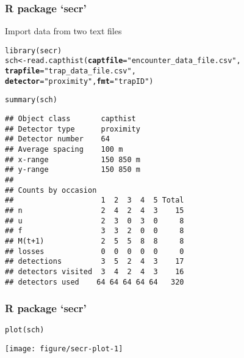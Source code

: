 \documentclass[color=usenames,dvipsnames]{beamer}\usepackage[]{graphicx}\usepackage[]{color}
\makeatletter
\newcommand{\hlstr}[1]{\textcolor[rgb]{0.749,0.012,0.012}{#1}}%
\newcommand{\hlstd}[1]{\textcolor[rgb]{0,0,0}{#1}}%
\newcommand{\hlkwb}[1]{\textcolor[rgb]{0,0.341,0.682}{#1}}%
\newcommand{\hlkwc}[1]{\textcolor[rgb]{0,0,0}{\textbf{#1}}}%
\newcommand{\hlkwd}[1]{\textcolor[rgb]{0.004,0.004,0.506}{#1}}%
\newenvironment{kframe}{%
 \def\at@end@of@kframe{}%
 \ifinner\ifhmode%
  \def\at@end@of@kframe{\end{minipage}}%
  \begin{minipage}{\columnwidth}%
 \fi\fi%
 \def\FrameCommand##1{\hskip\@totalleftmargin \hskip-\fboxsep
 \colorbox{shadecolor}{##1}\hskip-\fboxsep
     \hskip-\linewidth \hskip-\@totalleftmargin \hskip\columnwidth}%
 \MakeFramed {\advance\hsize-\width
   \@totalleftmargin\z@ \linewidth\hsize
   \@setminipage}}%
 {\par\unskip\endMakeFramed%
 \at@end@of@kframe}
\newenvironment{knitrout}{}{} %
\makeatother
\begin{document}
\begin{frame}[fragile]
  \frametitle{R package `secr'}
  Import data from two text files
\begin{knitrout}\tiny
{}\color{fgcolor}\begin{kframe}
\begin{alltt}
\hlkwd{library}\hlstd{(secr)}
\hlstd{sch} \hlkwb{<-} \hlkwd{read.capthist}\hlstd{(}\hlkwc{captfile}\hlstd{=}\hlstr{"encounter_data_file.csv"}\hlstd{,}
                     \hlkwc{trapfile}\hlstd{=}\hlstr{"trap_data_file.csv"}\hlstd{,}
                     \hlkwc{detector}\hlstd{=}\hlstr{"proximity"}\hlstd{,} \hlkwc{fmt}\hlstd{=}\hlstr{"trapID"}\hlstd{)}
\end{alltt}


{\ttfamily\noindent\itshape\color{messagecolor}{\#\# No errors found :-)}}\begin{alltt}
\hlkwd{summary}\hlstd{(sch)}
\end{alltt}
\begin{verbatim}
## Object class       capthist 
## Detector type      proximity 
## Detector number    64 
## Average spacing    100 m 
## x-range            150 850 m 
## y-range            150 850 m 
## 
## Counts by occasion 
##                    1  2  3  4  5 Total
## n                  2  4  2  4  3    15
## u                  2  3  0  3  0     8
## f                  3  3  2  0  0     8
## M(t+1)             2  5  5  8  8     8
## losses             0  0  0  0  0     0
## detections         3  5  2  4  3    17
## detectors visited  3  4  2  4  3    16
## detectors used    64 64 64 64 64   320
\end{verbatim}
\end{kframe}
\end{knitrout}
\end{frame}



\begin{frame}[fragile]
  \frametitle{R package `secr'}
\begin{knitrout}
\color{fgcolor}\begin{kframe}
\begin{alltt}
\hlkwd{plot}\hlstd{(sch)}
\end{alltt}
\end{kframe}

{\centering \texttt{[image: figure/secr-plot-1]} 

}


\end{knitrout}
\end{frame}
\end{document}
